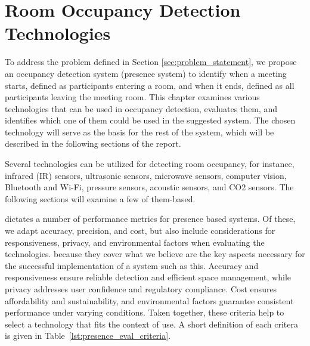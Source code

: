 \chapter{\label{sec:presence_intro}Room Occupancy Detection Technologies}
To address the problem defined in Section \ref{sec:problem_statement}, we propose an occupancy detection system (presence system) to identify when a meeting starts, defined as participants entering a room, and when it ends, defined as all participants leaving the meeting room.
This chapter examines various technologies that can be used in occupancy detection, evaluates them, and identifies which one of them could be used in the suggested system.
The chosen technology will serve as the basis for the rest of the system, which will be described in the following sections of the report.

Several technologies can be utilized for detecting room occupancy, for instance, infrared (IR) sensors\cite{woodward-2021, dodierBuildingOccupancyDetection2006, OccupancySensorMotion}, ultrasonic sensors\cite{woodward-2021, dodierBuildingOccupancyDetection2006, OccupancySensorMotion}, microwave sensors\cite{woodward-2021}, computer vision\cite{co2sensor, longoAccurateOccupancyEstimation2019, OccupancySensorMotion}, Bluetooth and Wi-Fi\cite{teissedre-2019}, pressure sensors\cite{OccupancySensorMotion}, acoustic sensors\cite{OccupancySensorMotion}, and CO2 sensors\cite{co2sensor, longoAccurateOccupancyEstimation2019, jinSensingProxyOccupancy2015}.\cite{faragherLocationFingerprintingBluetooth2015}
The following sections will examine a few of them-based.

\citeauthor{presence_ble_review} \cite{presence_ble_review} dictates a number of performance metrics for presence based systems. Of these, we adapt accuracy, precision, and cost, but also include considerations for responsiveness, privacy, and environmental factors when evaluating the technologies.
because they cover what we believe are the key aspects necessary for the successful implementation of a system such as this.
Accuracy and responsiveness ensure reliable detection and efficient space management, while privacy addresses user confidence and regulatory compliance.
Cost ensures affordability and sustainability, and environmental factors guarantee consistent performance under varying conditions.
Taken together, these criteria help to select a technology that fits the context of use.
A short definition of each critera is given in Table~\ref{lst:presence_eval_criteria}.

